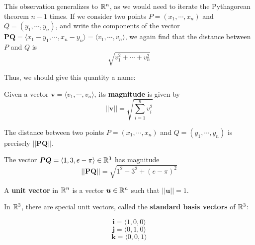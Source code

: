 This observation generalizes to $\mathbb{R}^n$, as we would need to iterate the Pythagorean theorem $n-1$ times.  If we consider two points $P = (x_1, \cdots, x_n)$ and $Q = (y_1, \cdots, y_n)$,
and write the components of the vector $\bm{PQ} = \langle x_1-y_1, \cdots, x_n-y_n \rangle = \langle v_1, \cdots, v_n \rangle$, we again find that the distance between $P$ and $Q$ is $$\sqrt{v_1^2 + \cdots + v_n^2}$$

Thus, we should give this quantity a name:

    \begin{definition}
    Given a vector $\bm{v} = \langle v_1, \cdots, v_n \rangle$, its \textbf{magnitude} is given by $$||\bm{v}|| = \sqrt{\sum_{i=1}^n v_i^2}$$
    \end{definition}

    \begin{proposition}
        The distance between two points $P = (x_1, \cdots, x_n)$ and $Q = (y_1, \cdots, y_n)$ is precisely $||\bm{PQ}||$.
    \end{proposition}
    
    \begin{example}
    The vector $\bm{PQ} = \langle 1, 3, e-\pi \rangle \in \mathbb{R}^3$ has magnitude $$||\bm{PQ}|| = \sqrt{1^2+3^2 + (e-\pi)^2}$$
    \end{example}
    

    \begin{definition}
    A \textbf{unit vector} in $\mathbb{R}^n$ is a vector $\bm{u} \in \mathbb{R}^n$ such that $||\bm{u}|| = 1$.
    \end{definition}

    \begin{example}
        In $\mathbb{R}^3$, there are special unit vectors, called the \textbf{standard basis vectors} of $\mathbb{R}^3$:
        
        $$\bm{i} = \langle 1, 0, 0 \rangle$$
        $$\bm{j} = \langle 0, 1, 0 \rangle$$
        $$\bm{k} = \langle 0, 0, 1 \rangle$$
        
            \begin{center}
        \end{center}
        
    \end{example}

